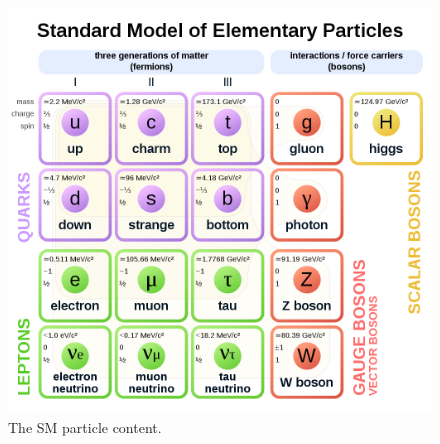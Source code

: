 \begin{figure}
\centering
\includegraphics[scale=0.4]{figures/intro/sm_particles.png}
\caption{The SM particle content.}
\label{sm_particles}
\end{figure}